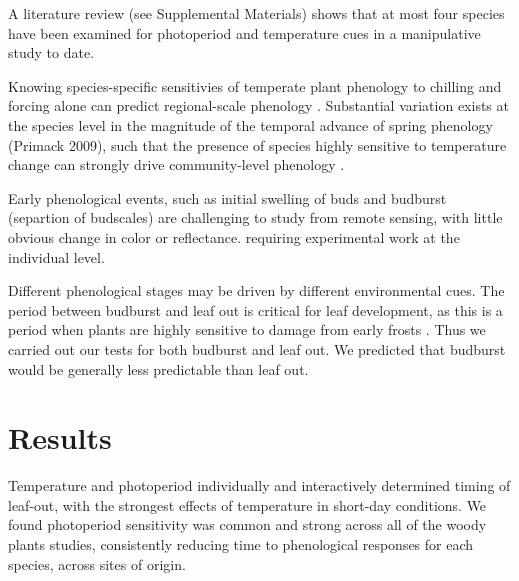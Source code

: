 \documentclass[12pt]{article}
\begin{document}
A literature review (see Supplemental Materials) shows that at most four species have been examined for photoperiod and temperature cues in a manipulative study to date. 


Knowing species-specific sensitivies of temperate plant phenology to chilling and forcing alone can predict regional-scale phenology \cite{Chuine:2000}. Substantial variation exists at the species level in the magnitude of the temporal advance of spring phenology (Primack 2009), such that the presence of species highly sensitive to temperature change can strongly drive community-level phenology \cite{Diez:2012}.

Early phenological events, such as initial swelling of buds and budburst (separtion of budscales) are challenging to study from remote sensing, with little obvious change in color or reflectance. 
requiring experimental work at the individual level. 

Different phenological stages may be driven by different environmental cues. The period between budburst and leaf out is critical for leaf development, as this is a period when plants are highly sensitive to damage from early frosts . Thus we carried out our tests for both budburst and leaf out. We predicted that budburst would be generally less predictable than leaf out. %


\section*{Results}

Temperature and photoperiod individually and interactively determined timing of leaf-out, with the strongest effects of temperature in short-day conditions. We found photoperiod sensitivity was common and strong across all of the woody plants studies, consistently reducing time to phenological responses for each species, across sites of origin. 
\end{document}
